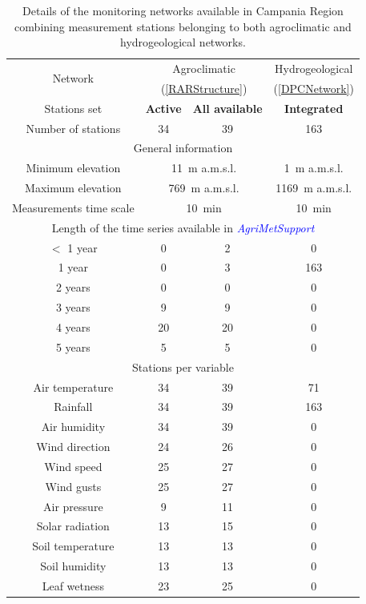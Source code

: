 \documentclass[authoryear,preprint,review,12pt]{elsarticle}
\newcommand{\update}[1]{\emph{\textcolor{blue}{#1}}}
\newcommand{\gci}{\update{AgriMetSupport}\xspace}
\begin{document}
\begin{table}[]
    \centering
    \begin{tabular}{c|c|c|c}
        \multirow{2}{*}{Network} & \multicolumn{2}{c|}{\footnotesize{Agroclimatic}} & \footnotesize{Hydrogeological} \\
        & \multicolumn{2}{c|}{\footnotesize{(\cref{RARStructure})}} & \footnotesize{(\cref{DPCNetwork})} \\
        Stations set & \textbf{\scriptsize{Active}} & \textbf{\scriptsize{All available}} & \textbf{\scriptsize{Integrated}} \\ 
        \hline
        Number of stations & 34 & 39 & 163\\
        \hline
        \multicolumn{4}{c}{General information} \\
        \hline
        Minimum elevation & \multicolumn{2}{c}{\SI{11}{\metre} a.m.s.l.} & \SI{1}{\metre} a.m.s.l. \\
        Maximum elevation & \multicolumn{2}{c}{\SI{769}{\metre} a.m.s.l.} & \SI{1169}{\metre} a.m.s.l.\\
        Measurements time scale & \multicolumn{2}{c}{\SI{10}{\minute}} & \SI{10}{\minute} \\
        \hline
        \multicolumn{4}{c}{Length of the time series available in \gci} \\
        \hline
        $<$ 1 year & 0 & 2 & 0 \\
        1 year & 0 & 3 & 163\\
        2 years & 0 & 0 & 0 \\
        3 years & 9 & 9 & 0\\
        4 years & 20 & 20 & 0\\
        5 years & 5 & 5 & 0\\
        \hline
        \multicolumn{4}{c}{Stations per variable} \\
        \hline
        Air temperature & 34 & 39 & 71\\
        Rainfall & 34 & 39 & 163\\
        Air humidity & 34 & 39 & 0\\
        Wind direction & 24 & 26 & 0\\
        Wind speed & 25 & 27 & 0\\
        Wind gusts & 25 & 27 & 0\\
        Air pressure & 9 & 11 & 0\\
        Solar radiation & 13 & 15 & 0\\
        Soil temperature & 13 & 13 & 0\\
        Soil humidity & 13 & 13 & 0\\
        Leaf wetness & 23 & 25 & 0 
    \end{tabular}
    \caption{Details of the monitoring networks available  in Campania Region combining measurement stations belonging to both agroclimatic and hydrogeological networks.}
    \label{tab:rarSummary}
\end{table}
\end{document}
